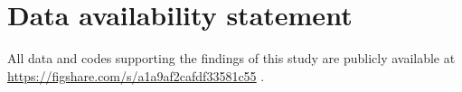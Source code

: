 \documentclass[authoryear,preprint,review,12pt]{elsarticle}
\begin{document}
\section*{Data availability statement}

All data and codes supporting the findings of this study are publicly available at \\
\url{https://figshare.com/s/a1a9af2cafdf33581c55} .


\baselineskip12pt
 
 
\end{document}
